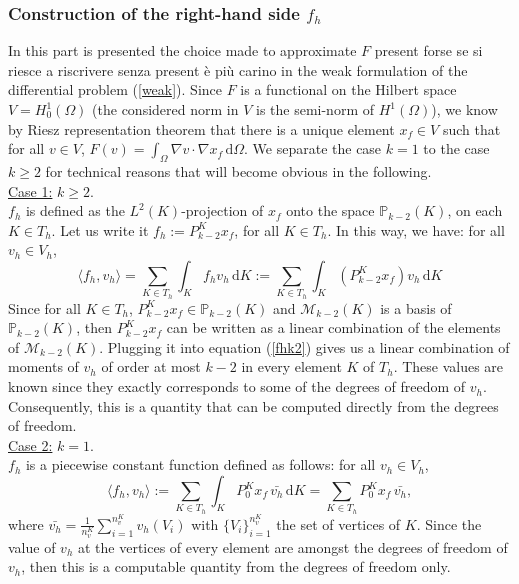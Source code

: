 \subsubsection{Construction of the right-hand side $f_h$}
In this part is presented the choice made to approximate $F$ present {\color{red} forse se si riesce a riscrivere senza present è più carino} in the weak formulation of the differential problem (\ref{weak}). Since $F$ is a functional on the Hilbert space $V=H_0^1(\Omega)$ (the considered norm in $V$ is the semi-norm of $H^1(\Omega)$), we know by Riesz representation theorem that there is a unique element $x_f\in V$ such that for all $v\in V$, $F(v) = \int_\Omega \nabla v\cdot\nabla x_f\, \mathrm{d}\Omega$. We separate the case $k=1$ to the case $k\geq 2$ for technical reasons that will become obvious in the following.\\

\noindent \underline{Case 1:} $k\geq 2$. \\
$f_h$ is defined as the $L^2(K)$-projection of $x_f$ onto the space $\mathbb{P}_{k-2}(K)$, on each $K\in T_h$. Let us write it $f_h := P_{k-2}^Kx_f$, for all $K\in T_h$. In this way, we have: for all $v_h\in V_h$, 
\begin{equation} \label{fhk2}
\langle f_h, v_h \rangle = \sum_{K\in T_h} \int_K f_h v_h \, \mathrm{d}K := \sum_{K\in T_h}\int_K \left(P_{k-2}^Kx_f\right)v_h\, \mathrm{d}K
\end{equation}
Since for all $K\in T_h$, $P_{k-2}^Kx_f\in \mathbb{P}_{k-2}(K)$ and $\mathcal{M}_{k-2}(K)$ is a basis of $\mathbb{P}_{k-2}(K)$, then $P_{k-2}^Kx_f$ can be written as a linear combination of the elements of $\mathcal{M}_{k-2}(K)$. Plugging it into equation (\ref{fhk2}) gives us a linear combination of moments of $v_h$ of order at most $k-2$ in every element $K$ of $T_h$. These values are known since they exactly corresponds to some of the degrees of freedom of $v_h$. Consequently, this is a quantity that can be computed directly from the degrees of freedom. \\

\noindent \underline{Case 2:} $k=1$. \\
$f_h$ is a piecewise constant function defined as follows: for all $v_h\in V_h$, 
$$\langle f_h, v_h \rangle := \sum_{K\in T_h} \int_K P_0^Kx_f\, \bar{v_h} \,\mathrm{d}K = \sum_{K\in T_h}P_0^Kx_f\,\bar{v_h},$$
where $\bar{v_h} = \frac{1}{n_v^K}\sum_{i=1}^{n_v^K}v_h(V_i)$ with $\{V_i\}_{i=1}^{n_v^K}$ the set of vertices of $K$. 
Since the value of $v_h$ at the vertices of every element are amongst the degrees of freedom of $v_h$, then this is a computable quantity from the degrees of freedom only. \\

